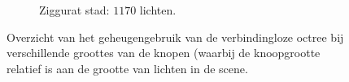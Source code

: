 \begin{figure}[p]
\begin{adjustbox}{minipage=\textwidth, scale=0.6}
  \end{adjustbox} %
  \begin{adjustbox}{minipage=\textwidth, scale=0.6}
    \begin{subfigure}[b]{0.83\textwidth}
      \centering
      \def\svgwidth{\textwidth}
      
      \caption{Ziggurat stad: $1170$ lichten.}
      \label{fig:hs-nodesize-::zc-high}
    \end{subfigure}
  \end{adjustbox}
  \caption{Overzicht van het geheugengebruik van de verbindingloze octree
           bij verschillende groottes van de knopen (waarbij de knoopgrootte
           relatief is aan de grootte van lichten in de scene.}
  \label{fig:hs-nodesize-memory}
\end{figure}
